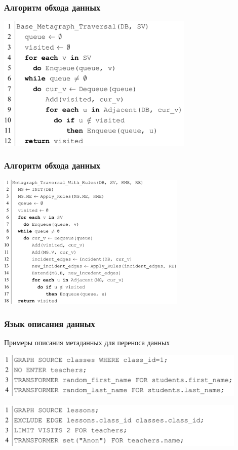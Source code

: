 \documentclass[pdf, hyperref={unicode}, aspectratio=169]{beamer}
\begin{document}
\begin{frame}
\frametitle{Алгоритм обхода данных}

	\begin{center}
		\includegraphics[height = 6.5cm]{img/algorithm-base}
	\end{center}
\end{frame}


\begin{frame}
\frametitle{Алгоритм обхода данных}

	\begin{center}
		\includegraphics[height = 6.5cm]{img/algorithm-with-rules}
	\end{center}
\end{frame}


\begin{frame}
\frametitle{Язык описания данных}
	Примеры описания метаданных для переноса данных

	\begin{center}
		\includegraphics[width = 12cm]{img/language-1}
	\end{center}

	\begin{center}
		\includegraphics[width = 12cm]{img/language-2}
	\end{center}
\end{frame}
\end{document}
